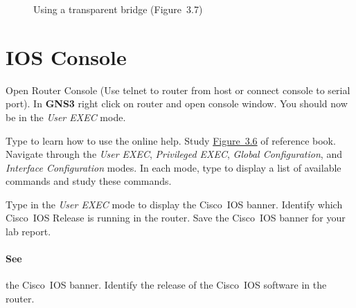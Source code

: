 \documentclass{../UTNetLab}
\begin{document}
    \begin{figure}[H]
        \centering
        \caption{Using a transparent bridge (Figure~3.7)}\label{fig:3.7}
    \end{figure}


\section{IOS Console}
    Open Router Console (Use telnet to router from host or connect console to serial port).
    In \textbf{GNS3} right click on router and open console window.
    You should now be in the \textit{User EXEC} mode.

    Type  to learn how to use the online help.
    Study \hyperref[fig:3.6]{Figure~3.6} of reference book.
    Navigate through the \textit{User EXEC}, \textit{Privileged EXEC}, \textit{Global Configuration}, and \textit{Interface Configuration} modes.
    In each mode, type  to display a list of available commands and study these commands.

    Type  in the \textit{User EXEC} mode to display the Cisco~IOS banner.
    Identify which Cisco~IOS Release is running in the router.
    Save the Cisco~IOS banner for your lab report.

    \paragraph{See} the Cisco~IOS banner.
    Identify the release of the Cisco~IOS software in the router.
\end{document}
